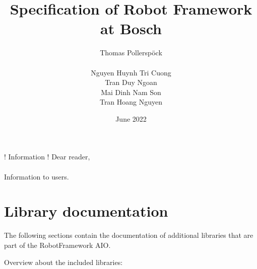 \documentclass[a4paper,10pt]{report}
\begin{document}
\author{Thomas Pollerspöck \\ \\ Nguyen Huynh Tri Cuong \\ Tran Duy Ngoan \\ Mai Dinh Nam Son \\ Tran Hoang Nguyen}
\title{Specification of Robot Framework at Bosch}
\date{June 2022}


\maketitle

\begin{boxinfo}{! Information !}{
Dear reader, \\
\\
Information to users.
}
\end{boxinfo}

\tableofcontents

\listoftodos





\chapter{Library documentation}

The following sections contain the documentation of additional libraries that are part of the RobotFramework AIO.

Overview about the included libraries:



\end{document}
